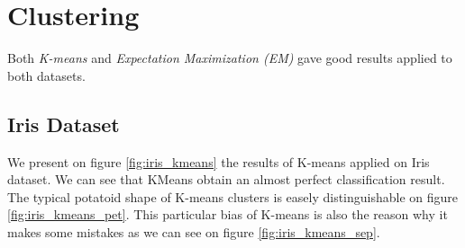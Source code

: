 \documentclass[twocolumn, 10pt]{article}
\begin{document}
	\section{Clustering}
		Both \textit{K-means} and \textit{Expectation Maximization (EM)} gave good results applied to both datasets.
		\subsection{Iris Dataset}
			We present on figure \ref{fig:iris_kmeans} the results of K-means applied on Iris dataset. We can see that KMeans obtain an almost perfect classification result. The typical potatoid shape of K-means clusters is easely distinguishable on figure \ref{fig:iris_kmeans_pet}. This particular bias of K-means is also the reason why it makes some mistakes as we can see on figure \ref{fig:iris_kmeans_sep}.
\end{document}
